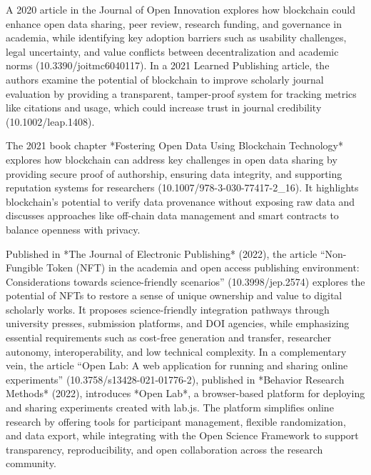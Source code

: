 \documentclass{article}
\begin{document}

A 2020 article in the Journal of Open Innovation explores how blockchain could enhance open data sharing, peer review, research funding, and governance in academia, while identifying key adoption barriers such as usability challenges, legal uncertainty, and value conflicts between decentralization and academic norms (10.3390/joitmc6040117). In a 2021 Learned Publishing article, the authors examine the potential of blockchain to improve scholarly journal evaluation by providing a transparent, tamper-proof system for tracking metrics like citations and usage, which could increase trust in journal credibility (10.1002/leap.1408).


The 2021 book chapter *Fostering Open Data Using Blockchain Technology* explores how blockchain can address key challenges in open data sharing by providing secure proof of authorship, ensuring data integrity, and supporting reputation systems for researchers (10.1007/978-3-030-77417-2_16). It highlights blockchain’s potential to verify data provenance without exposing raw data and discusses approaches like off-chain data management and smart contracts to balance openness with privacy.


Published in *The Journal of Electronic Publishing* (2022), the article “Non-Fungible Token (NFT) in the academia and open access publishing environment: Considerations towards science-friendly scenarios” (10.3998/jep.2574) explores the potential of NFTs to restore a sense of unique ownership and value to digital scholarly works. It proposes science-friendly integration pathways through university presses, submission platforms, and DOI agencies, while emphasizing essential requirements such as cost-free generation and transfer, researcher autonomy, interoperability, and low technical complexity. In a complementary vein, the article “Open Lab: A web application for running and sharing online experiments” (10.3758/s13428-021-01776-2), published in *Behavior Research Methods* (2022), introduces *Open Lab*, a browser-based platform for deploying and sharing experiments created with lab.js. The platform simplifies online research by offering tools for participant management, flexible randomization, and data export, while integrating with the Open Science Framework to support transparency, reproducibility, and open collaboration across the research community.
\end{document}
